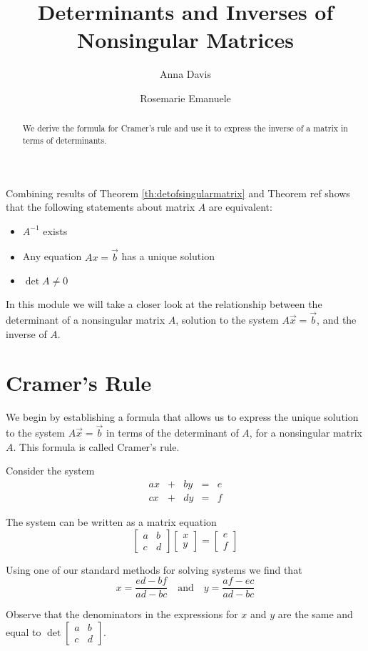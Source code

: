 \documentclass{ximera}
\author{Anna Davis \and Rosemarie Emanuele} \title{Determinants and Inverses of Nonsingular Matrices} \license{CC-BY 4.0}
\begin{document}
\begin{abstract}
 We derive the formula for Cramer's rule and use it to express the inverse of a matrix in terms of determinants.
\end{abstract}
\maketitle

Combining results of Theorem \ref{th:detofsingularmatrix} and Theorem {\color{red}ref} shows that the following statements about matrix $A$ are equivalent:
\begin{itemize}
\item $A^{-1}$ exists
\item Any equation $Ax=\vec{b}$ has a unique solution
\item $\det{A}\neq 0$
\end{itemize}
In this module we will take a closer look at the relationship between the determinant of a nonsingular matrix $A$, solution to the system $A\vec{x}=\vec{b}$, and the inverse of $A$.  
\section*{Cramer's Rule}
We begin by establishing a formula that allows us to express the unique solution to the system $A\vec{x}=\vec{b}$ in terms of the determinant of $A$, for a nonsingular matrix $A$.  This formula is called Cramer's rule.

Consider the system
$$\begin{array}{ccccc}
      ax& +&by&=&e\\
      cx & +&dy&= &f 
    \end{array}$$
    
 The system can be written as a matrix equation
 $$\begin{bmatrix}a&b\\c&d\end{bmatrix}\begin{bmatrix}x\\y\end{bmatrix}=\begin{bmatrix}e\\f\end{bmatrix}$$
 
 Using one of our standard methods for solving systems we find that 
 $$x=\frac{ed-bf}{ad-bc}\quad\text{and}\quad y=\frac{af-ec}{ad-bc}$$
 
 Observe that the denominators in the expressions for $x$ and $y$ are the same and equal to $\det{\begin{bmatrix}a&b\\c&d\end{bmatrix}}$.
 
\end{document}

